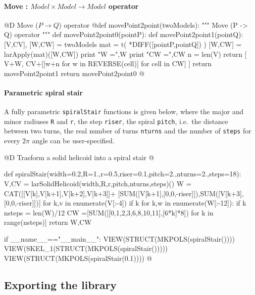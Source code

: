 \documentclass[11pt,oneside]{article}    %
\begin{document}
\paragraph{Move : $Model \times Model \to Model$ operator}
@D Move ($P\to Q$) operator
@{def movePoint2point(twoModels):
    """ Move (P -> Q) operator """
    def movePoint2point0(pointP):
        def movePoint2point1(pointQ):
            [V,CV], [W,CW] = twoModels
            mat = t( *DIFF([pointP,pointQ]) )
            [W,CW] = larApply(mat)([W,CW])
            print "\n W =",W
            print "\n CW =",CW
            n = len(V)
            return [ V+W, CV+[[w+n for w in REVERSE(cell)] for cell in CW] ] 
        return movePoint2point1    
    return movePoint2point0
@}


\paragraph{Parametric spiral stair}

A fully parametric \texttt{spiralStair} functions is given below, where the major and minor radiuses \texttt{R} and \texttt{r}, the step \texttt{riser}, the spiral \texttt{pitch}, i.e.~the distance between two turns, the real number of turns \texttt{nturns} and the number of \texttt{steps} for every $2\pi$ angle can be user-specified.

@D Trasform a solid helicoid into a spiral stair
@{def spiralStair(width=0.2,R=1.,r=0.5,riser=0.1,pitch=2.,nturns=2.,steps=18):
    V,CV = larSolidHelicoid(width,R,r,pitch,nturns,steps)()
    W = CAT([[V[k],V[k+1],V[k+2],V[k+3]]+
        [SUM([V[k+1],[0,0,-riser]]),SUM([V[k+3],[0,0,-riser]])]
        for k,v in enumerate(V[:-4]) if k%
    for k,w in enumerate(W[:-12]):
        if k%
    nsteps = len(W)/12
    CW =[SUM([[0,1,2,3,6,8,10,11],[6*k]*8]) for k in range(nsteps)]
    return W,CW

if __name__=="__main__":
    VIEW(STRUCT(MKPOLS(spiralStair())))
    VIEW(SKEL_1(STRUCT(MKPOLS(spiralStair()))))
    VIEW(STRUCT(MKPOLS(spiralStair(0.1))))
@}

\subsection{Exporting the library}
\end{document}
